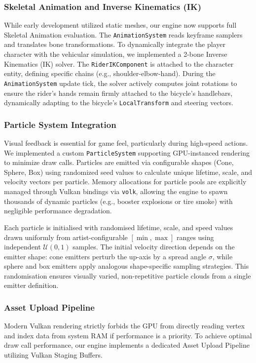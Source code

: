 \documentclass[acmtog, nonacm]{acmart}
\begin{document}
\subsubsection{Skeletal Animation and Inverse Kinematics (IK)}
While early development utilized static meshes, our engine now supports full Skeletal Animation evaluation. The \texttt{AnimationSystem} reads keyframe samplers and translates bone transformations. To dynamically integrate the player character with the vehicular simulation, we implemented a 2-bone Inverse Kinematics (IK) solver. The \texttt{RiderIKComponent} is attached to the character entity, defining specific chains (e.g., shoulder-elbow-hand). During the \texttt{AnimationSystem} update tick, the solver actively computes joint rotations to ensure the rider's hands remain firmly attached to the bicycle's handlebars, dynamically adapting to the bicycle's \texttt{LocalTransform} and steering vectors.

\subsubsection{Particle System Integration}
Visual feedback is essential for game feel, particularly during high-speed actions. We implemented a custom \texttt{ParticleSystem} supporting GPU-instanced rendering to minimize draw calls. Particles are emitted via configurable shapes (Cone, Sphere, Box) using randomized seed values to calculate unique lifetime, scale, and velocity vectors per particle. Memory allocations for particle pools are explicitly managed through Vulkan bindings via \texttt{volk}, allowing the engine to spawn thousands of dynamic particles (e.g., booster explosions or tire smoke) with negligible performance degradation.

Each particle is initialised with randomised lifetime, scale, and speed values drawn uniformly from artist-configurable $[\min, \max]$ ranges using independent $\mathcal{U}(0,1)$ samples. The initial velocity direction depends on the emitter shape: cone emitters perturb the up-axis by a spread angle $\sigma$, while sphere and box emitters apply analogous shape-specific sampling strategies. This randomisation ensures visually varied, non-repetitive particle clouds from a single emitter definition.

\subsubsection{Asset Upload Pipeline}
Modern Vulkan rendering strictly forbids the GPU from directly reading vertex and index data from system RAM if performance is a priority. To achieve optimal draw call performance, our engine implements a dedicated Asset Upload Pipeline utilizing Vulkan Staging Buffers.
\end{document}

